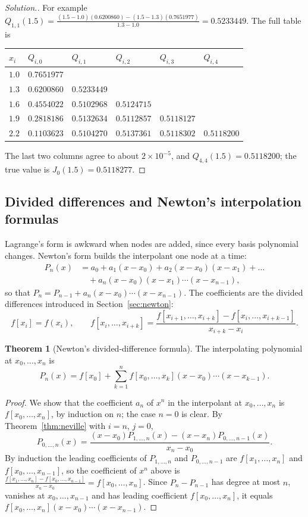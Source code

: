 \documentclass[11pt,a4paper]{article}
\numberwithin{equation}{section}
\theoremstyle{definition}
\newtheorem{thm}{Theorem}[subsection]
\newenvironment{solution}
  {\renewcommand{\qedsymbol}{}\begin{proof}[\textit{Solution}.]}
  {\end{proof}}
\begin{document}
\begin{solution}
For example $Q_{1,1}(1.5) = \frac{(1.5-1.0)(0.6200860)-(1.5-1.3)(0.7651977)}{1.3-1.0} = 0.5233449$. The full table is
\begin{center}
\begin{tabular}{llllll}
\hline
$x_i$ & $Q_{i,0}$ & $Q_{i,1}$ & $Q_{i,2}$ & $Q_{i,3}$ & $Q_{i,4}$\\
\hline
$1.0$ & $0.7651977$ & & & & \\
$1.3$ & $0.6200860$ & $0.5233449$ & & & \\
$1.6$ & $0.4554022$ & $0.5102968$ & $0.5124715$ & & \\
$1.9$ & $0.2818186$ & $0.5132634$ & $0.5112857$ & $0.5118127$ & \\
$2.2$ & $0.1103623$ & $0.5104270$ & $0.5137361$ & $0.5118302$ & $0.5118200$\\
\hline
\end{tabular}
\end{center}
The last two columns agree to about $2\times10^{-5}$, and $Q_{4,4}(1.5) = 0.5118200$; the true value is $J_0(1.5) = 0.5118277$.
\end{solution}


\subsection{Divided differences and Newton's interpolation formulas}
\label{sec:divdiff}

Lagrange's form is awkward when nodes are added, since every basis polynomial changes. Newton's form builds the interpolant one node at a
time:
\begin{align*}
P_n(x) &= a_0+a_1(x-x_0)+a_2(x-x_0)(x-x_1)+\dots\\
&\quad+a_n(x-x_0)(x-x_1)\cdots(x-x_{n-1}),
\end{align*}
so that $P_n = P_{n-1}+a_n(x-x_0)\cdots(x-x_{n-1})$. The coefficients are the divided differences introduced in Section~\ref{sec:newton}:
$$f[x_i] = f(x_i),\qquad f[x_i,\dots,x_{i+k}] = \frac{f[x_{i+1},\dots,x_{i+k}]-f[x_i,\dots,x_{i+k-1}]}{x_{i+k}-x_i} .$$

\begin{thm}[Newton's divided-difference formula]
\label{thm:newtondd}
The interpolating polynomial at $x_0,\dots,x_n$ is
$$P_n(x) = f[x_0]+\sum_{k=1}^nf[x_0,\dots,x_k](x-x_0)\cdots(x-x_{k-1}) .$$
\end{thm}

\begin{proof}
We show that the coefficient $a_n$ of $x^n$ in the interpolant at $x_0,\dots,x_n$ is $f[x_0,\dots,x_n]$, by induction on $n$; the case $n = 0$ is
clear. By Theorem~\ref{thm:neville} with $i = n$, $j = 0$,
$$P_{0,\dots,n}(x) = \frac{(x-x_0)P_{1,\dots,n}(x)-(x-x_n)P_{0,\dots,n-1}(x)}{x_n-x_0} .$$
By induction the leading coefficients of $P_{1,\dots,n}$ and $P_{0,\dots,n-1}$ are $f[x_1,\dots,x_n]$ and $f[x_0,\dots,x_{n-1}]$, so the coefficient of
$x^n$ above is $\frac{f[x_1,\dots,x_n]-f[x_0,\dots,x_{n-1}]}{x_n-x_0} = f[x_0,\dots,x_n]$. Since $P_n-P_{n-1}$ has degree at most $n$, vanishes at
$x_0,\dots,x_{n-1}$ and has leading coefficient $f[x_0,\dots,x_n]$, it equals $f[x_0,\dots,x_n](x-x_0)\cdots(x-x_{n-1})$.
\end{proof}
\end{document}
